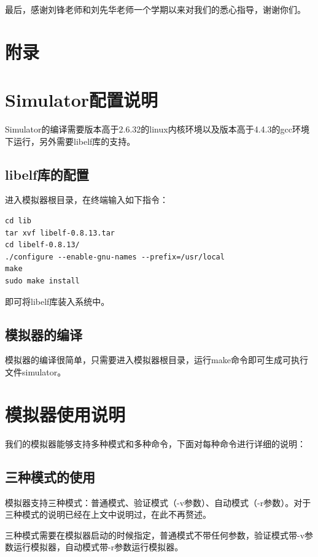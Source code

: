 \documentclass[12pt,a4paper]{article}
\begin{document}
最后，感谢刘锋老师和刘先华老师一个学期以来对我们的悉心指导，谢谢你们。

\newpage

\section*{附录}

\appendix

\section{Simulator配置说明}

Simulator的编译需要版本高于2.6.32的linux内核环境以及版本高于4.4.3的gcc环境下运行，另外需要libelf库的支持。

\subsection{libelf库的配置}

进入模拟器根目录，在终端输入如下指令：

\begin{lstlisting}
cd lib
tar xvf libelf-0.8.13.tar
cd libelf-0.8.13/
./configure --enable-gnu-names --prefix=/usr/local
make
sudo make install
\end{lstlisting}

即可将libelf库装入系统中。

\subsection{模拟器的编译}

模拟器的编译很简单，只需要进入模拟器根目录，运行make命令即可生成可执行文件simulator。

\newpage

\section{模拟器使用说明}

我们的模拟器能够支持多种模式和多种命令，下面对每种命令进行详细的说明：

\subsection{三种模式的使用}
模拟器支持三种模式：普通模式、验证模式（-v参数）、自动模式（-r参数）。对于三种模式的说明已经在上文中说明过，在此不再赘述。

三种模式需要在模拟器启动的时候指定，普通模式不带任何参数，验证模式带-v参数运行模拟器，自动模式带-r参数运行模拟器。
\end{document}
